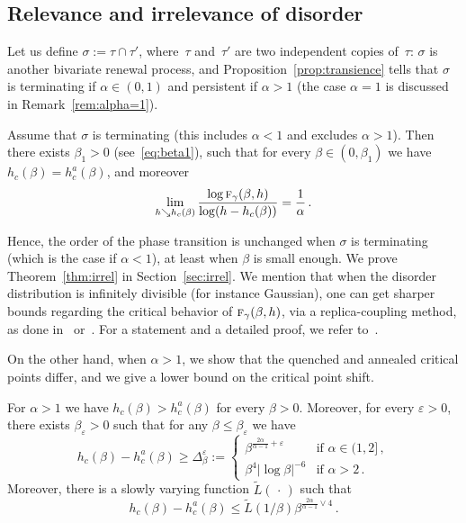 \documentclass[AHL,Unicode,longabstracts]{cedram}
\newcommand{\ga}{\alpha}
\newcommand{\gb}{\beta}
\newcommand{\gep}{\varepsilon}
\newcommand{\gD}{\Delta}
\newcommand{\tf}{\textsc{f}} %
\renewcommand{\tilde}{\widetilde}
\begin{document}
\subsection{Relevance and irrelevance of disorder}

Let us define $\sigma :=\tau \cap \tau'$, where~$\tau$ and~$\tau'$ are two independent copies of~$\tau$: $\sigma$ is another bivariate renewal process, and Proposition~\ref{prop:transience} tells that $\sigma$ is terminating if $\ga\in(0,1)$ and persistent if $\ga>1$ (the case $\ga=1$ is discussed in Remark~\ref{rem:alpha=1}).


\begin{theo}\label{thm:irrel}
Assume that $\sigma$ is terminating (this includes $\ga<1$ and excludes $\ga >1$). Then there exists $\beta_1>0$ (see~\eqref{eq:beta1}), such that for every $\beta \in (0,\beta_1)$ we have $h_c(\beta) = h_c^a(\beta)$, and moreover
\begin{equation}\label{eq:s2}
\lim_{h \searrow h_c(\beta)} \frac{\log \tf_{\gamma}(\beta,h)}{\log (h-h_c(\beta))} = \frac{1}{\ga}\,.
\end{equation}
\end{theo}

Hence, the order of the phase transition is unchanged when $\sigma$ is terminating (which is the case if $\ga<1$), at least when $\gb$ is small enough. We prove Theorem~\ref{thm:irrel} in Section~\ref{sec:irrel}. We mention that when the disorder distribution is infinitely divisible (for instance Gaussian), one can get sharper bounds regarding the critical behavior of $\tf_{\gamma}(\beta,h)$, via a replica-coupling method, as done in~\cite{cf:Ton08} or~\cite{cf:Wa12}. For a statement and a detailed proof, we refer to~\cite{cf:Khatib}.

On the other hand, when $\ga>1$, we show that the quenched and annealed critical points differ, and we give a lower bound on the critical point shift.

\begin{theo}\label{thm:rel}
For $\ga>1$ we have $h_c(\gb) > h_c^{a}(\gb)$ for every $\beta>0$. Moreover, for every $\gep>0$, there exists $\gb_{\gep}>0$ such that for any $\gb\leq \gb_\gep$ we have
\begin{equation}\label{eq:rel}
h_c(\beta) - h_c^{a}(\beta)\ge \gD_{\gb}^{\gep}:=
\begin{cases}
\gb^{\frac{2\ga}{\ga-1} +\gep} & \text{if } \ga\in(1,2]\,, \\
\gb^4 \mathopen|\log \gb |^{-6} & \text{if } \ga >2\,.
\end{cases}
\end{equation}
Moreover, there is a slowly varying function $\tilde{L}({\,\cdot\,})$ such that
\begin{equation}\label{eq:upb}
h_c(\beta) - h_c^a (\beta) \le
\tilde{L}(1/\gb) \gb^{\frac{2\ga}{\ga-1} \vee 4}\,.
\end{equation}
\end{theo}
\end{document}
